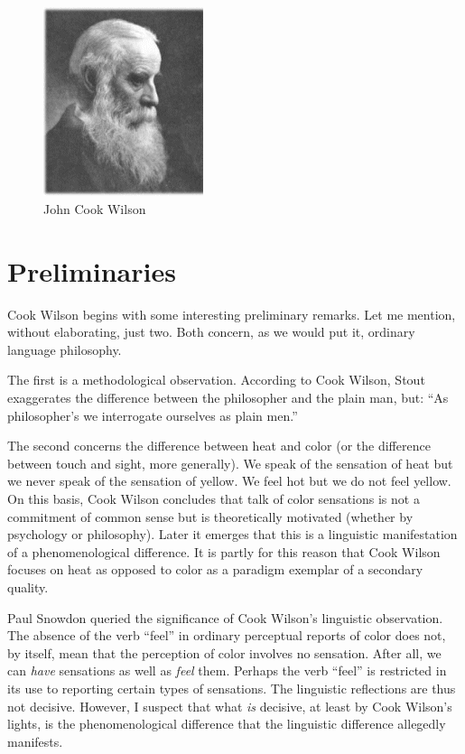 \documentclass[11pt]{article}
\title{\mytitle\\
\mysubtitle}
\author{\myauthor}
\date{} %
\begin{document}
\maketitle

\setlength{\parindent}{1em}


\begin{figure}[htbp]
	\centering
		\includegraphics[scale=1]{../graphics/wilson.jpg}
	\caption{John Cook Wilson}
	\label{fig:wilson}
\end{figure}

\section{Preliminaries} %
\label{sec:preliminaries}

Cook Wilson begins with some interesting preliminary remarks. Let me mention, without elaborating, just two. Both concern, as we would put it, ordinary language philosophy. 

The first is a methodological observation. According to Cook Wilson, Stout exaggerates the difference between the philosopher and the plain man, but: ``As philosopher's we interrogate ourselves as plain men.'' 

The second concerns the difference between heat and color (or the difference between touch and sight, more generally). We speak of the sensation of heat but we never speak of the sensation of yellow. We feel hot but we do not feel yellow. On this basis, Cook Wilson concludes that talk of color sensations is not a commitment of common sense but is theoretically motivated (whether by psychology or philosophy). Later it emerges that this is a linguistic manifestation of a phenomenological difference. It is partly for this reason that Cook Wilson focuses on heat as opposed to color as a paradigm exemplar of a secondary quality.

\begin{discussion}
    Paul Snowdon queried the significance of Cook Wilson's linguistic observation. The absence of the verb ``feel'' in ordinary perceptual reports of color does not, by itself, mean that the perception of color involves no sensation. After all, we can \emph{have} sensations as well as \emph{feel} them. Perhaps the verb ``feel'' is restricted in its use to reporting certain types of sensations. The linguistic reflections are thus not decisive. However, I suspect that what \emph{is} decisive, at least by Cook Wilson's lights, is the phenomenological difference that the linguistic difference allegedly manifests.
\end{discussion}
\end{document}
